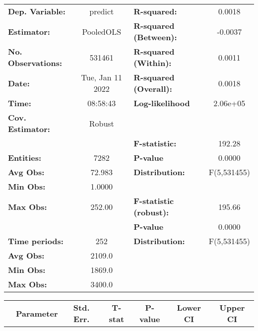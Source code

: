 \begin{center}
\begin{tabular}{lclc}
\toprule
\textbf{Dep. Variable:}    &      predict       & \textbf{  R-squared:         }   &      0.0018      \\
\textbf{Estimator:}        &     PooledOLS      & \textbf{  R-squared (Between):}  &     -0.0037      \\
\textbf{No. Observations:} &       531461       & \textbf{  R-squared (Within):}   &      0.0011      \\
\textbf{Date:}             &  Tue, Jan 11 2022  & \textbf{  R-squared (Overall):}  &      0.0018      \\
\textbf{Time:}             &      08:58:43      & \textbf{  Log-likelihood     }   &     2.06e+05     \\
\textbf{Cov. Estimator:}   &       Robust       & \textbf{                     }   &                  \\
\textbf{}                  &                    & \textbf{  F-statistic:       }   &      192.28      \\
\textbf{Entities:}         &        7282        & \textbf{  P-value            }   &      0.0000      \\
\textbf{Avg Obs:}          &       72.983       & \textbf{  Distribution:      }   &   F(5,531455)    \\
\textbf{Min Obs:}          &       1.0000       & \textbf{                     }   &                  \\
\textbf{Max Obs:}          &       252.00       & \textbf{  F-statistic (robust):} &      195.66      \\
\textbf{}                  &                    & \textbf{  P-value            }   &      0.0000      \\
\textbf{Time periods:}     &        252         & \textbf{  Distribution:      }   &   F(5,531455)    \\
\textbf{Avg Obs:}          &       2109.0       & \textbf{                     }   &                  \\
\textbf{Min Obs:}          &       1869.0       & \textbf{                     }   &                  \\
\textbf{Max Obs:}          &       3400.0       & \textbf{                     }   &                  \\
\bottomrule
\end{tabular}
\begin{tabular}{lcccccc}
                & \textbf{Parameter} & \textbf{Std. Err.} & \textbf{T-stat} & \textbf{P-value} & \textbf{Lower CI} & \textbf{Upper CI}  \\

\end{tabular}
\end{center}
